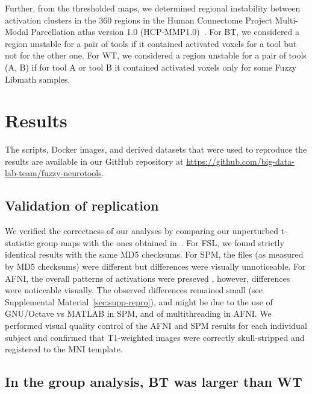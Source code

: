 \documentclass[11pt,onecolumn]{article}
\begin{document}
Further, from the thresholded maps, we determined regional instability
between activation clusters in the 360 regions in the Human Connectome
Project Multi-Modal Parcellation atlas version 1.0
(HCP-MMP1.0)~\cite{glasser2016multi}. For BT, we considered a region
unstable for a pair of tools if it contained activated voxels for a tool
but not for the other one. For WT, we considered a region unstable for a
pair of tools (A, B) if for tool A or tool B it contained activated voxels only for some Fuzzy Libmath
samples.

\section{Results}
The scripts, Docker images, and derived datasets that were used to reproduce the results are available
in our GitHub repository at \url{https://github.com/big-data-lab-team/fuzzy-neurotools}.

\subsection{Validation of replication}

We verified the correctness of our analyses by comparing our unperturbed
t-statistic group maps with the ones obtained
in~\cite{bowring2019exploring}. For FSL, we found
strictly identical results with the same MD5 checksums. For SPM, the files (as measured by MD5 checksums) were different but differences
were visually unnoticeable. For AFNI, the overall patterns of activations were preseved
, however, differences were noticeable visually.
The observed differences remained small (see Supplemental Material~\ref{sec:supp-repro}), and might be due to the use of
GNU/Octave vs MATLAB in SPM, and of multithreading in AFNI. We performed visual quality control of the AFNI
and SPM results for each individual subject and confirmed that T1-weighted images were
correctly skull-stripped and registered to the MNI template.

\subsection{In the group analysis, BT was larger than WT}
\end{document}
